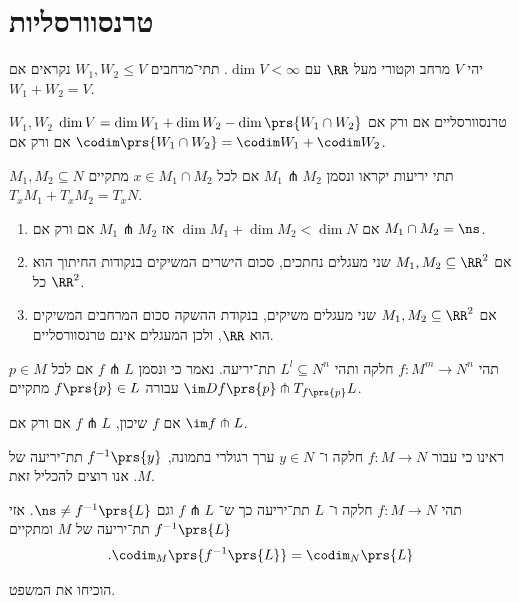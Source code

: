 \documentclass[a4paper,10pt,twoside,openany]{book}
\begin{document}
\section{טרנסוורסליות}
\begin{definition}
יהי
$V$
מרחב וקטורי מעל
$\RR$
עם
$\dim V < \infty$.
תתי־מרחבים
$W_1,W_2 \leq V$
נקראים
אם
$W_1 + W_2 = V$.
\end{definition}
\begin{remark}
$W_1,W_2$
טרנסוורסליים אם ורק אם
$\dim V = \dim W_1 + \dim W_2 - \dim\prs{W_1 \cap W_2}$
אם ורק אם
$\codim\prs{W_1 \cap W_2} = \codim W_1 + \codim W_2$.
\end{remark}
\begin{definition}
$M_1, M_2 \subseteq N$
תתי יריעות יקראו
ונסמן
$M_1 \pitchfork M_2$
אם לכל
$x \in M_1 \cap M_2$
מתקיים
$T_x M_1 + T_x M_2 = T_x N$.
\end{definition}
\begin{examples}
\begin{enumerate}
\item
אם
$\dim M_1 + \dim M_2 < \dim N$
אז
$M_1 \pitchfork M_2$
אם ורק אם
$M_1 \cap M_2 = \ns$.
\item
אם
$M_1, M_2 \subseteq \RR^2$
שני מעגלים נחתכים, סכום הישרים המשיקים בנקודות החיתוך הוא כל
$\RR^2$.
\item
אם
$M_1, M_2 \subseteq \RR^2$
שני מעגלים משיקים, בנקודת ההשקה סכום המרחבים המשיקים הוא
$\RR$,
ולכן המעגלים אינם טרנסוורסליים.
\end{enumerate}
\end{examples}
\begin{definition}
תהי
$f \colon M^m \to N^n$
חלקה ותהי
$L^l \subseteq N^n$
תת־יריעה.
נאמר כי
ונסמן
$f \pitchfork L$
אם לכל
$p \in M$
עבורה
$f\prs{p} \in L$
מתקיים
$\im Df\prs{p} \pitchfork T_{f\prs{p}}L$.
\end{definition}
\begin{remark}
אם
$f$
שיכון,
$f \pitchfork L$
אם ורק אם
$\im f \pitchfork L$.
\end{remark}

ראינו כי עבור
$f \colon M \to N$
חלקה ו־%
$y \in N$
ערך רגולרי בתמונה,
$f^{-1}\prs{y}$
תת־יריעה של
$M$.
אנו רוצים להכליל זאת.

\begin{theorem}
תהי
$f \colon M \to N$
חלקה ו־%
$L$
תת־יריעה כך ש־%
$f \pitchfork L$
וגם
$\ns \neq f^{-1}\prs{L}$.
אזי
$f^{-1}\prs{L}$
תת־יריעה של
$M$
ומתקיים
\[\text{.}\codim_{M}\prs{f^{-1}\prs{L}} = \codim_N\prs{L}\]
\end{theorem}
\begin{exercise}
הוכיחו את המשפט.
\end{exercise}
\end{document}
